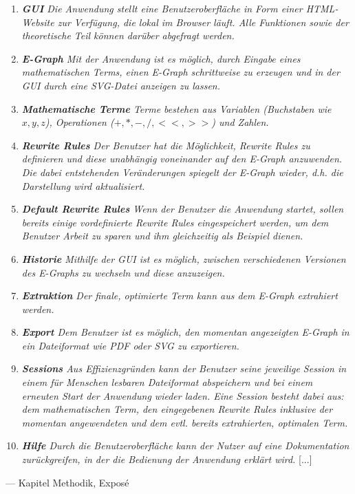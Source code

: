 \begin{tcolorbox}[enhanced, frame hidden, borderline west = {1.5pt}{0pt}{gray-700},lower separated=false,fontupper=\sffamily]
\begin{enumerate}[topsep=0pt,itemsep=-0.5ex,partopsep=1ex,parsep=1ex]
    \item {\sffamily\itshape \textbf{GUI} Die Anwendung stellt eine Benutzeroberfläche in Form einer HTML-Website zur Verfügung, die lokal im Browser läuft.
        Alle Funktionen sowie der theoretische Teil können darüber abgefragt werden.}
    \item {\sffamily\itshape \textbf{E-Graph} Mit der Anwendung ist es möglich, durch Eingabe eines mathematischen Terms, einen E-Graph schrittweise zu erzeugen und in der GUI durch eine SVG-Datei anzeigen zu lassen.}
    \item {\sffamily\itshape \textbf{Mathematische Terme} Terme bestehen aus Variablen (Buchstaben wie $x, y, z$), Operationen ($+, *, -, /, <<, >>$) und Zahlen.}
    \item {\sffamily\itshape \textbf{Rewrite Rules} Der Benutzer hat die Möglichkeit, Rewrite Rules zu definieren und diese unabhängig voneinander auf den E-Graph anzuwenden. Die dabei entstehenden
        Veränderungen spiegelt der E-Graph wieder, d.h. die Darstellung wird aktualisiert.}
    \item {\sffamily\itshape \textbf{Default Rewrite Rules} Wenn der Benutzer die Anwendung startet, sollen bereits einige vordefinierte Rewrite Rules eingespeichert werden, um dem Benutzer Arbeit zu sparen und
        ihm gleichzeitig als Beispiel dienen.}
    \item {\sffamily\itshape \textbf{Historie} Mithilfe der GUI ist es möglich, zwischen verschiedenen Versionen des E-Graphs zu wechseln und diese anzuzeigen.}
    \item {\sffamily\itshape \textbf{Extraktion} Der finale, optimierte Term kann aus dem E-Graph extrahiert werden.}
    \item {\sffamily\itshape \textbf{Export} Dem Benutzer ist es möglich, den momentan angezeigten E-Graph in ein Dateiformat wie PDF oder SVG zu exportieren.}
    \item {\sffamily\itshape \textbf{Sessions} Aus Effizienzgründen kann der Benutzer seine jeweilige Session in einem für Menschen lesbaren Dateiformat abspeichern und bei einem erneuten Start der Anwendung wieder
        laden. Eine Session besteht dabei aus: dem mathematischen Term, den eingegebenen Rewrite Rules inklusive der momentan angewendeten und dem evtl. bereits extrahierten, optimalen Term.}
    \item{\sffamily\itshape \textbf{Hilfe} Durch die Benutzeroberfläche kann der Nutzer auf eine Dokumentation zurückgreifen, in der die Bedienung der Anwendung erklärt wird.} [...] \grqq
\end{enumerate}
    
\begin{flushright}
    --- Kapitel Methodik, Exposé
\end{flushright}
\end{tcolorbox}




